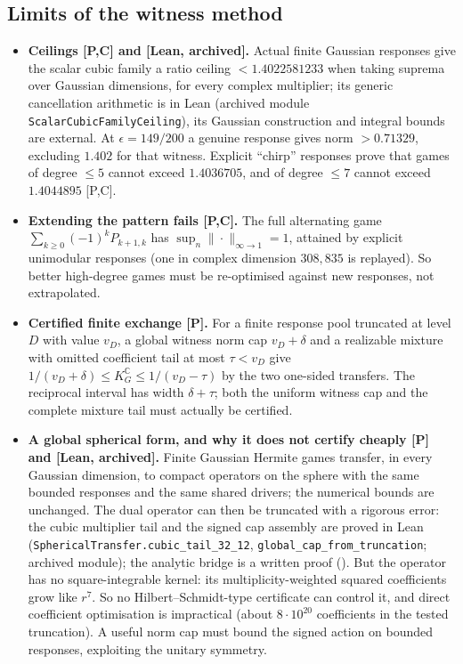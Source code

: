 \documentclass[11pt,a4paper]{article}
\newcommand{\C}{\mathbb{C}}
\newcommand{\KG}{K_G^{\C}}
\newcommand{\lean}[1]{\texttt{\small #1}}
\begin{document}
\subsection{Limits of the witness method}
\begin{itemize}
\item \textbf{Ceilings [P,C] and [Lean, archived].} Actual finite Gaussian responses give the scalar cubic family a
 ratio ceiling $<1.4022581233$ when taking suprema over Gaussian dimensions, for every complex multiplier; its generic cancellation arithmetic
 is in Lean (archived module \lean{ScalarCubicFamilyCeiling}), its Gaussian construction and integral bounds are external. At $\epsilon=149/200$ a genuine response
 gives norm $>0.71329$, excluding $1.402$ for that witness. Explicit ``chirp'' responses prove that games of
 degree $\le5$ cannot exceed $1.4036705$, and of degree $\le7$ cannot exceed $1.4044895$ [P,C].
\item \textbf{Extending the pattern fails [P,C].} The full alternating game $\sum_{k\ge0}(-1)^kP_{k+1,k}$ has
 $\sup_n\|\cdot\|_{\infty\to1}=1$, attained by explicit unimodular responses (one in complex dimension $308{,}835$ is
 replayed). So better high-degree games must be re-optimised against new responses, not extrapolated.
\item \textbf{Certified finite exchange [P].} For a finite response pool truncated at level $D$ with value $v_D$, a
 global witness norm cap $v_D+\delta$ and a realizable mixture with omitted coefficient tail at most $\tau<v_D$
 give $1/(v_D+\delta)\le\KG\le1/(v_D-\tau)$ by the two one-sided transfers. The reciprocal interval has width $\delta+\tau$;
 both the uniform witness cap and the complete mixture tail must actually be certified.
\item \textbf{A global spherical form, and why it does not certify cheaply [P] and [Lean, archived].} Finite Gaussian Hermite games
 transfer, in every Gaussian dimension, to compact operators on the sphere with the same bounded responses and the same
 shared drivers; the numerical bounds are unchanged. The dual operator can then be truncated with a rigorous error: the
 cubic multiplier tail and the signed cap assembly are proved in Lean (\lean{SphericalTransfer.cubic\_tail\_32\_12},
 \lean{global\_cap\_from\_truncation}; archived module); the analytic bridge is a written proof
 (). But
 the operator has no square-integrable kernel: its multiplicity-weighted squared coefficients grow like $r^7$. So no
 Hilbert--Schmidt-type certificate can control it, and direct coefficient optimisation is impractical (about
 $8\cdot10^{20}$ coefficients in the tested truncation). A useful norm cap must bound the signed action on bounded
 responses, exploiting the unitary symmetry.
\end{itemize}
\end{document}
